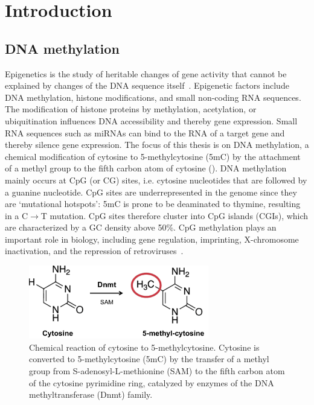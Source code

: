 
\chapter{Introduction} \label{sec:intro}

\ifpdf
    \graphicspath{{Chapter1/Figs/Raster/}{Chapter1/Figs/PDF/}{Chapter1/Figs/}}
\else
    \graphicspath{{Chapter1/Figs/Vector/}{Chapter1/Figs/}}
\fi

\section{DNA methylation} \label{sec:intro_met}

Epigenetics is the study of heritable changes of gene activity that cannot be explained by changes of the DNA sequence itself~\citep{holliday_dna_1996}. Epigenetic factors include DNA methylation, histone modifications, and small non-coding RNA sequences. The modification of histone proteins by methylation, acetylation, or ubiquitination influences DNA accessibility and thereby gene expression. Small RNA sequences such as miRNAs can bind to the RNA of a target gene and thereby silence gene expression. The focus of this thesis is on DNA methylation, a chemical modification of cytosine to 5-methylcytosine (5mC) by the attachment of a methyl group to the fifth carbon atom of cytosine ().  DNA methylation mainly occurs at CpG (or CG) sites, i.e. cytosine nucleotides that are followed by a guanine nucleotide. CpG sites are underrepresented in the genome since they are `mutational hotspots': 5mC is prone to be deaminated to thymine, resulting in a C$\rightarrow$T mutation. CpG sites therefore cluster into CpG islands (CGIs), which are characterized by a GC density above 50\%. CpG methylation plays an important role in biology, including gene regulation, imprinting, X-chromosome inactivation, and the repression of retroviruses~\citep{holliday_dna_1996,robertson_dna_2005,jones_functions_2012,moore_dna_2013}.

\begin{figure}[htbp!]
\centering
\includegraphics[width=0.7\textwidth]{cpg}
\caption[Chemical reaction of cytosine to 5-methylcytosine.]{Chemical reaction of cytosine to 5-methylcytosine. Cytosine is converted to 5-methylcytosine (5mC) by the transfer of a methyl group from S-adenosyl-L-methionine (SAM) to the fifth carbon atom of the cytosine pyrimidine ring, catalyzed by enzymes of the DNA methyltransferase (Dnmt) family.}
\label{fig:intro_cpg}
\end{figure}

